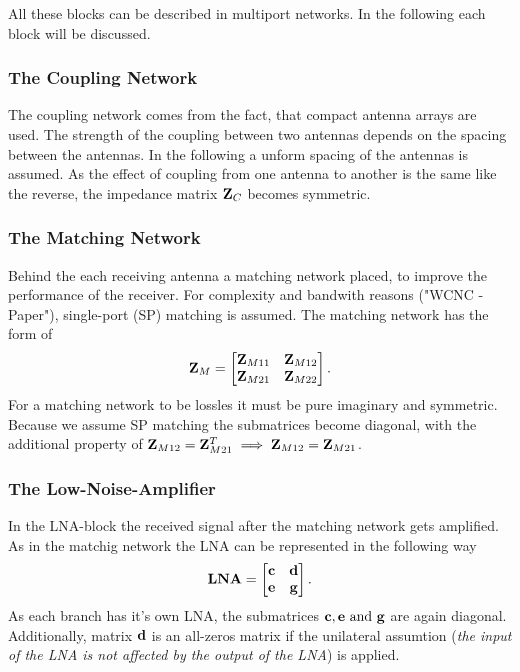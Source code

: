 All these blocks can be described in multiport networks.
In the following each block will be discussed.

\subsubsection{The Coupling Network}
\label{sec:coupling_network}
The coupling network comes from the fact, that compact antenna arrays are used.
The strength of the coupling between two antennas depends on the spacing between the antennas.
In the following a unform spacing of the antennas is assumed.
As the effect of coupling from one antenna to another is the same like the reverse, the impedance matrix $\mathbf{Z}_C$ becomes symmetric.


\subsubsection{The Matching Network}
Behind the each receiving antenna a matching network placed, to improve the performance of the receiver.
For complexity and bandwith reasons ("WCNC - Paper"), single-port (SP) matching is assumed.
The matching network has the form of 
\begin{equation}
\mathbf{Z}_M=
\begin{bmatrix}
\mathbf{Z}_{M11} & \mathbf{Z}_{M12} \\
\mathbf{Z}_{M21} & \mathbf{Z}_{M22}
\end{bmatrix}.
\end{equation}
For a matching network to be lossles it must be pure imaginary and symmetric\cite{Nossek}.
Because we assume SP matching the submatrices become diagonal, with the additional property of $\mathbf{Z}_{M12} = \mathbf{Z}_{M21}^T \implies \mathbf{Z}_{M12} = \mathbf{Z}_{M21}$.


\subsubsection{The Low-Noise-Amplifier}
In the LNA-block the received signal after the matching network gets amplified.
As in the matchig network the LNA can be represented in the following way
\begin{equation}
\mathbf{LNA}=
\begin{bmatrix}
\mathbf{c} & \mathbf{d} \\
\mathbf{e} & \mathbf{g}
\end{bmatrix}.
\end{equation}
As each branch has it's own LNA, the submatrices $\mathbf{c},\mathbf{e}\text{ and }\mathbf{g}$ are again diagonal.
Additionally, matrix $\mathbf{d}$ is an all-zeros matrix if the unilateral assumtion (\textit{the input of the LNA is not affected by the output of the LNA}) is applied.


